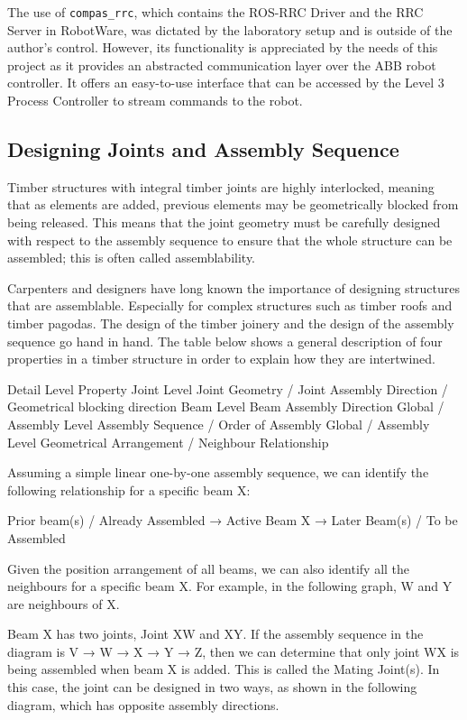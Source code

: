 The use of \verb|compas_rrc|, which contains the ROS-RRC Driver and the RRC Server in RobotWare, was dictated by the laboratory setup and is outside of the author’s control. However, its functionality is appreciated by the needs of this project as it provides an abstracted communication layer over the ABB robot controller. It offers an easy-to-use interface that can be accessed by the Level 3 Process Controller to stream commands to the robot.

\subsection{Designing Joints and Assembly Sequence}
\label{subsection:exploration-2-designing-joints-and-assembly-sequence}

Timber structures with integral timber joints are highly interlocked, meaning that as elements are added, previous elements may be geometrically blocked from being released. This means that the joint geometry must be carefully designed with respect to the assembly sequence to ensure that the whole structure can be assembled; this is often called assemblability. 

Carpenters and designers have long known the importance of designing structures that are assemblable. Especially for complex structures such as timber roofs and timber pagodas. The design of the timber joinery and the design of the assembly sequence go hand in hand. The table below shows a general description of four properties in a timber structure in order to explain how they are intertwined.

Detail Level
Property
Joint Level
Joint Geometry / Joint Assembly Direction / Geometrical blocking direction 
Beam Level
Beam Assembly Direction
Global / Assembly Level
Assembly Sequence / Order of Assembly
Global / Assembly Level
Geometrical Arrangement / Neighbour Relationship


Assuming a simple linear one-by-one assembly sequence, we can identify the following relationship for a specific beam X:

Prior beam(s) / Already Assembled → Active Beam X → Later Beam(s) / To be Assembled

Given the position arrangement of all beams, we can also identify all the neighbours for a specific beam X. For example, in the following graph, W and Y are neighbours of X.

Beam X has two joints, Joint XW and XY. If the assembly sequence in the diagram is V → W → X → Y → Z, then we can determine that only joint WX is being assembled when beam X is added. This is called the Mating Joint(s). In this case, the joint can be designed in two ways, as shown in the following diagram, which has opposite assembly directions.


